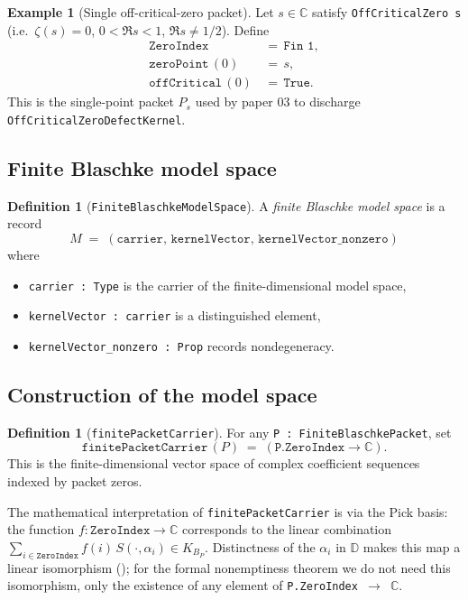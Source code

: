 \documentclass[11pt]{article}
\theoremstyle{plain}
\theoremstyle{definition}
\newtheorem{definition}[theorem]{Definition}
\newtheorem{example}[theorem]{Example}
\theoremstyle{remark}
\newcommand{\KBp}{K_{B_{P}}}
\newcommand{\C}{\mathbb{C}}
\newcommand{\D}{\mathbb{D}}
\newcommand{\code}[1]{\texttt{#1}}
\begin{document}
\begin{example}[Single off-critical-zero packet]
Let $s\in\C$ satisfy \code{OffCriticalZero s} (i.e.\ $\zeta(s)=0$,
$0<\Re s<1$, $\Re s \ne 1/2$).  Define
\begin{align*}
   \code{ZeroIndex}      &\,=\, \code{Fin 1}, \\
   \code{zeroPoint}\,(0) &\,=\, s, \\
   \code{offCritical}\,(0) &\,=\, \texttt{True}.
\end{align*}
This is the single-point packet $P_{s}$ used by paper 03 to discharge
\code{OffCriticalZeroDefectKernel}.
\end{example}

\subsection{Finite Blaschke model space}

\begin{definition}[\code{FiniteBlaschkeModelSpace}]\label{def:fbms}
A \emph{finite Blaschke model space} is a record
\[
   M \;=\; (\code{carrier},\,\code{kernelVector},\,\code{kernelVector\_nonzero})
\]
where
\begin{itemize}
  \item \code{carrier : Type} is the carrier of the finite-dimensional
        model space,
  \item \code{kernelVector : carrier} is a distinguished element,
  \item \code{kernelVector\_nonzero : Prop} records nondegeneracy.
\end{itemize}
\end{definition}

\subsection{Construction of the model space}

\begin{definition}[\code{finitePacketCarrier}]\label{def:fpc}
For any \code{P : FiniteBlaschkePacket}, set
\begin{equation}\label{eq:fpc}
  \code{finitePacketCarrier}\,(P) \;=\; (\code{P.ZeroIndex} \to \C).
\end{equation}
This is the finite-dimensional vector space of complex coefficient sequences
indexed by packet zeros.
\end{definition}

The mathematical interpretation of \code{finitePacketCarrier} is via the
Pick basis: the function $f\colon\code{ZeroIndex}\to\C$ corresponds to the
linear combination
\(\sum_{i\in\code{ZeroIndex}} f(i)\,S(\cdot,\alpha_{i}) \in \KBp.\)
Distinctness of the $\alpha_{i}$ in $\D$ makes this map a linear
isomorphism (); for the formal nonemptiness theorem we
do not need this isomorphism, only the existence of any element of
\code{P.ZeroIndex \(\to\) \(\C\)}.
\end{document}
